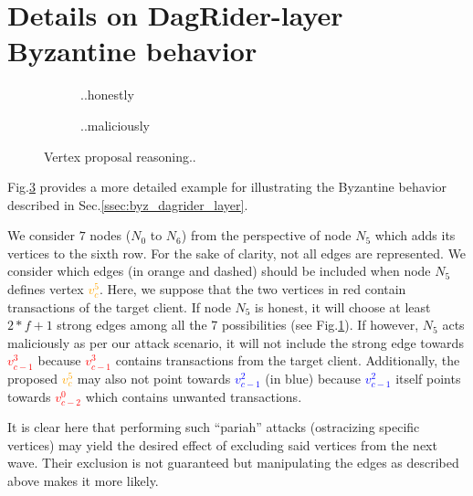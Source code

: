 

\section{Details on DagRider-layer Byzantine behavior\label{anx:detail_dag_rider_layer_attack}}




\begin{figure}[h]
    \centering

\begin{subfigure}{.225\textwidth}
    \centering
\scalebox{.8}{}
    \caption{..honestly}
    \label{fig:pariah_attack_concept_honest}
\end{subfigure}
%
\begin{subfigure}{.225\textwidth}
    \centering
\scalebox{.8}{}
    \caption{..maliciously}
    \label{fig:pariah_attack_concept_depth1}
\end{subfigure}
    
    \caption{Vertex proposal reasoning..}
    \label{fig:pariah_attack_concept}
\end{figure}




Fig.\ref{fig:pariah_attack_concept} provides a more detailed example for illustrating the Byzantine behavior described in Sec.\ref{ssec:byz_dagrider_layer}.

We consider $7$ nodes ($N_0$ to $N_6$) from the perspective of node $N_5$ which adds its vertices to the sixth row.
For the sake of clarity, not all edges are represented.
We consider which edges (in orange and dashed) should be included when node $N_5$ defines vertex \textcolor{orange}{$v^5_c$}.
Here, we suppose that the two vertices in red contain transactions of the target client.
If node $N_5$ is honest, it will choose at least $2*f+1$ strong edges among all the 7 possibilities (see Fig.\ref{fig:pariah_attack_concept_honest}).
If however, $N_5$ acts maliciously as per our attack scenario, it will not include the strong edge towards \textcolor{red}{$v^3_{c-1}$} because \textcolor{red}{$v^3_{c-1}$} contains transactions from the target client. Additionally, the proposed \textcolor{orange}{$v^5_c$} may also not point towards \textcolor{blue}{$v^2_{c-1}$} (in blue) because \textcolor{blue}{$v^2_{c-1}$} itself points towards \textcolor{red}{$v^0_{c-2}$} which contains unwanted transactions.

It is clear here that performing such ``pariah'' attacks (ostracizing specific vertices) may yield the desired effect of excluding said vertices from the next wave. 
Their exclusion is not guaranteed but manipulating the edges as described above makes it more likely. 

